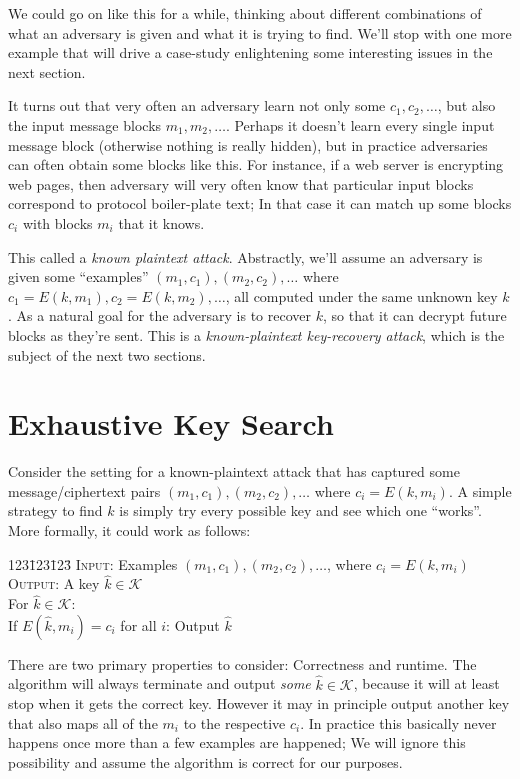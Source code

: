 \documentclass[11pt]{article}
\newcommand{\keys}{\mathcal{K}}
\begin{document}
We could go on like this for a while, thinking about different combinations of
what an adversary is given and what it is trying to find.  We'll stop with one
more example that will drive a case-study enlightening some interesting issues
in the next section.

It turns out that very often an adversary learn not only some $c_1,c_2,\ldots$,
but also the input message blocks $m_1,m_2,\ldots$. Perhaps it doesn't learn
every single input message block (otherwise nothing is really hidden), but
in practice adversaries can often obtain some blocks like this. For instance,
if a web server is encrypting web pages, then adversary will very often know
that particular input blocks correspond to protocol boiler-plate text; In
that case it can match up some blocks $c_i$ with blocks $m_i$ that it knows.

This called a \emph{known plaintext attack}. Abstractly, we'll assume an
adversary is given some ``examples'' $(m_1,c_1),(m_2,c_2),\ldots$ where
$c_1=E(k,m_1), c_2=E(k,m_2),\ldots$, all computed under the same unknown key
$k$. As a natural goal for the adversary is to recover $k$, so that it can
decrypt future blocks as they're sent. This is a \emph{known-plaintext
key-recovery attack}, which is the subject of the next two sections.

\section{Exhaustive Key Search}

Consider the setting for a known-plaintext attack that has captured some
message/ciphertext pairs $(m_1,c_1),(m_2,c_2),\ldots$ where $c_i=E(k,m_i)$. A
simple strategy to find $k$ is simply try every possible key and see which one
``works''. More formally, it could work as follows:

\begin{tabbing}123\=123\=123\=\kill
    \> \textsc{Input}: Examples $(m_1,c_1),(m_2,c_2),\ldots$, where $c_i=E(k,m_i)$\\
    \> \textsc{Output}: A key $\hat{k}\in\keys$\\
    \> For $\hat{k}\in\keys$:\\
    \> \> If $E(\hat{k},m_i)=c_i$ for all $i$: Output $\hat{k}$
\end{tabbing}

There are two primary properties to consider: Correctness and runtime. The
algorithm will always terminate and output \emph{some} $\hat{k}\in\keys$,
because it will at least stop when it gets the correct key. However it may in
principle output another key that also maps all of the $m_i$ to the respective
$c_i$. In practice this basically never happens once more than a few examples
are happened; We will ignore this possibility and assume the algorithm is
correct for our purposes.
\end{document}
